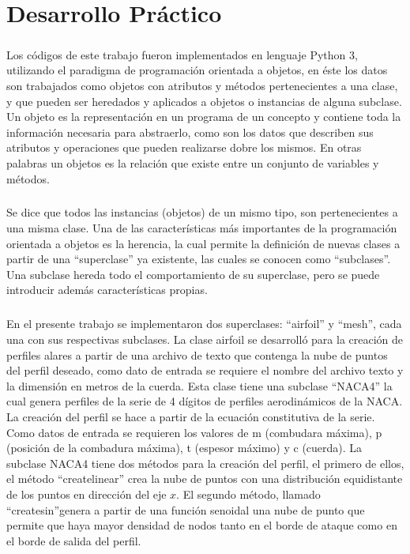 \documentclass[letterpaper, openright, 12pt]{book}
\begin{document}
\chapter{Desarrollo Práctico}
	\paragraph*{}
		Los códigos de este trabajo fueron implementados en lenguaje Python 3, utilizando el paradigma de programación orientada a objetos, en éste los datos son trabajados como objetos con atributos y métodos pertenecientes a una clase, y que pueden ser heredados y aplicados a objetos o instancias de alguna subclase. Un objeto  es la representación en un programa de un concepto y contiene toda la información necesaria para abstraerlo, como son los datos que describen sus atributos y operaciones que pueden realizarse dobre los mismos.  En otras palabras un objetos es la relación que existe entre un conjunto de variables y métodos.
	
	\paragraph*{}
		Se dice que todos las instancias (objetos) de un mismo tipo, son pertenecientes a una misma clase. Una de las características más importantes de la programación orientada a objetos es la herencia, la cual permite la definición de nuevas clases a partir de una ``superclase'' ya existente, las cuales se conocen como ``subclases''. Una subclase hereda todo el comportamiento de su superclase, pero se puede introducir además características propias.
		
	\paragraph*{}
		En el presente trabajo se implementaron dos superclases: ``airfoil'' y ``mesh'', cada una con sus respectivas subclases.
		La clase airfoil se desarrolló para la creación de perfiles alares a partir de una archivo de texto que contenga la nube de puntos del perfil deseado, como dato de entrada se requiere el nombre del archivo texto y la dimensión en metros de la cuerda. Esta clase tiene una subclase ``NACA4'' la cual genera perfiles de la serie de 4 dígitos de perfiles aerodinámicos de la NACA. La creación del perfil se hace a partir de la ecuación constitutiva de la serie. Como datos de entrada se requieren los valores de m (combudara máxima), p (posición de la combadura máxima), t (espesor máximo) y c (cuerda). La subclase NACA4 tiene dos métodos para la creación del perfil, el primero de ellos, el método ``create\textunderscore linear'' crea la nube de puntos con una distribución equidistante de los puntos en dirección del eje $x$. El segundo método, llamado ``create\textunderscore sin''genera a partir de una función senoidal una nube de punto que permite que haya mayor densidad de nodos tanto en el borde de ataque como en el borde de salida del perfil.
			 
\end{document}
